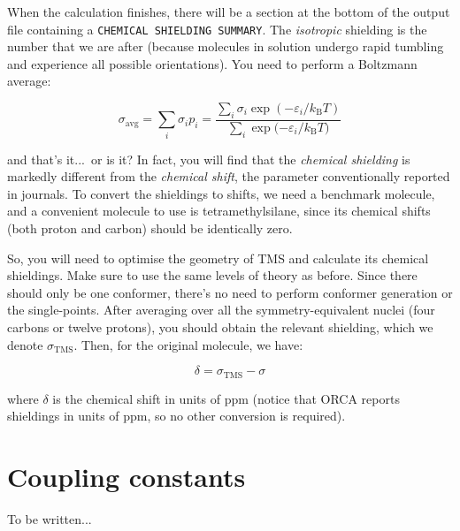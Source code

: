 \documentclass[10pt]{article}
\begin{document}
When the calculation finishes, there will be a section at the bottom of the output file containing a \texttt{CHEMICAL SHIELDING SUMMARY}. The \textit{isotropic} shielding is the number that we are after (because molecules in solution undergo rapid tumbling and experience all possible orientations). You need to perform a Boltzmann average:

\[ \sigma_{\text{avg}} = \sum_i \sigma_i p_i = \frac{\sum_i \sigma_i \exp{(-\varepsilon_i/k_\mathrm{B}T)}}{\sum_i \exp{(-\varepsilon_i/k_\mathrm{B}T})} \]

and that's it...\ or is it? In fact, you will find that the \textit{chemical shielding} is markedly different from the \textit{chemical shift}, the parameter conventionally reported in journals. To convert the shieldings to shifts, we need a benchmark molecule, and a convenient molecule to use is tetramethylsilane, since its chemical shifts (both proton and carbon) should be identically zero.

So, you will need to optimise the geometry of TMS and calculate its chemical shieldings. Make sure to use the same levels of theory as before. Since there should only be one conformer, there's no need to perform conformer generation or the single-points. After averaging over all the symmetry-equivalent nuclei (four carbons or twelve protons), you should obtain the relevant shielding, which we denote \(\sigma_{\text{TMS}}\). Then, for the original molecule, we have:

\[ \delta = \sigma_{\text{TMS}} - \sigma \]

where \(\delta\) is the chemical shift in units of ppm (notice that ORCA reports shieldings in units of ppm, so no other conversion is required).

\section{Coupling constants}

To be written...

\printbibliography
\end{document}
